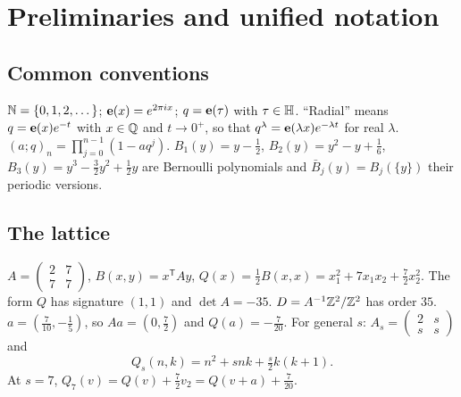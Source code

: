 \section{Preliminaries and unified notation}\label{sec:prelim}
\subsection{Common conventions}
$\mathbb{N}=\{0,1,2,\dots\}$; $\mathbf{e}(x)=e^{2\pi i x}$; $q=\mathbf{e}(\tau)$ with $\tau\in\mathbb{H}$. ``Radial'' means $q=\mathbf{e}(x)e^{-t}$ with $x\in\mathbb{Q}$ and $t\to0^+$, so that
$q^{\lambda}=\mathbf{e}(\lambda x)e^{-\lambda t}$ for real $\lambda$. $(a;q)_n=\prod_{j=0}^{n-1}(1-aq^j)$. $B_1(y)=y-\tfrac12$, $B_2(y)=y^2-y+\tfrac16$,
$B_3(y)=y^3-\tfrac32y^2+\tfrac12y$ are Bernoulli polynomials and $\bar B_j(y)=B_j(\{y\})$ their periodic versions.

\subsection{The lattice}
$A=\left(\begin{smallmatrix}2&7\\7&7\end{smallmatrix}\right)$, $B(x,y)=x^{\mathsf T}Ay$, $Q(x)=\tfrac12B(x,x)=x_1^2+7x_1x_2+\tfrac72x_2^2$. The form $Q$ has
signature $(1,1)$ and $\det A=-35$. $D=A^{-1}\mathbb{Z}^2/\mathbb{Z}^2$ has order $35$. $a=(\tfrac7{10},-\tfrac15)$, so $Aa=(0,\tfrac72)$ and $Q(a)=-\tfrac7{20}$.
For general $s$: $A_s=\left(\begin{smallmatrix}2&s\\s&s\end{smallmatrix}\right)$ and
\[
Q_s(n,k)=n^2+snk+\tfrac s2k(k+1).
\]
At $s=7$, $Q_7(v)=Q(v)+\tfrac72v_2=Q(v+a)+\tfrac7{20}$.

